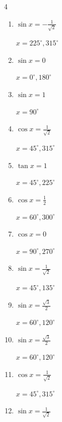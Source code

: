 \begin{multicols}{4}
\begin{enumerate}
  \item $\displaystyle \sin{x}  = -\frac{1}{\sqrt{2}}$

        $\displaystyle x = 225^{\circ} , 315^{\circ}$

  \item $\displaystyle \sin{x}  = 0$

        $\displaystyle x = 0^{\circ} , 180^{\circ}$

  \item $\displaystyle \sin{x}  = 1$

        $\displaystyle x = 90^{\circ}$

  \item $\displaystyle \cos{x}  = \frac{1}{\sqrt{2}}$

        $\displaystyle x = 45^{\circ} , 315^{\circ}$

  \item $\displaystyle \tan{x}  = 1$

        $\displaystyle x = 45^{\circ} , 225^{\circ}$

  \item $\displaystyle \cos{x}  = \frac{1}{2}$

        $\displaystyle x = 60^{\circ} , 300^{\circ}$

  \item $\displaystyle \cos{x}  = 0$

        $\displaystyle x = 90^{\circ} , 270^{\circ}$

  \item $\displaystyle \sin{x}  = \frac{1}{\sqrt{2}}$

        $\displaystyle x = 45^{\circ} , 135^{\circ}$

\columnbreak %

  \item $\displaystyle \sin{x}  = \frac{\sqrt{3}}{2}$

        $\displaystyle x = 60^{\circ} , 120^{\circ}$

  \item $\displaystyle \sin{x}  = \frac{\sqrt{3}}{2}$

        $\displaystyle x = 60^{\circ} , 120^{\circ}$

  \item $\displaystyle \cos{x}  = \frac{1}{\sqrt{2}}$

        $\displaystyle x = 45^{\circ} , 315^{\circ}$

  \item $\displaystyle \sin{x}  = \frac{1}{\sqrt{2}}$


\end{enumerate}
\end{multicols}
